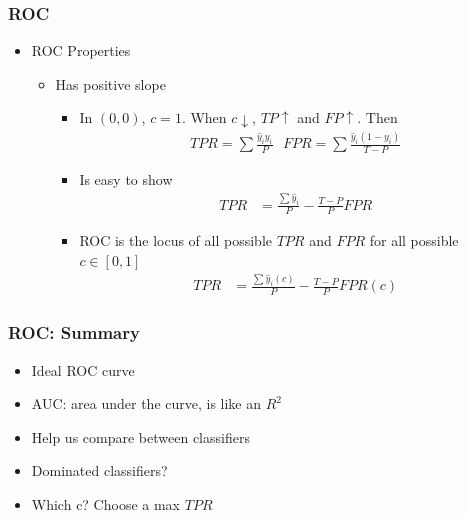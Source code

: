 \documentclass[
  shownotes,
  xcolor={svgnames},
  hyperref={colorlinks,citecolor=DarkBlue,linkcolor=DarkRed,urlcolor=DarkBlue}
  , aspectratio=169]{beamer}
\begin{document}
\begin{frame}[fragile]
\frametitle{ROC}
\begin{itemize}
  \item ROC Properties 

  \begin{itemize}
  \item Has positive slope
  \begin{itemize}
    \item In $(0,0)$, $c=1$. When $c\downarrow$, $TP \uparrow$ and $FP\uparrow$. Then
    \begin{align}
    TPR = \sum \frac{\hat{y}_iy_i}{P} \,\,\,\, FPR = \sum \frac{\hat{y}_i(1-y_i)}{T-P}
    \end{align}
    \item Is easy to show
    \begin{align}
    TPR &= \frac{\sum \hat{y}_i}{P} - \frac{T-P}{P}FPR
    \end{align}
    \item ROC is the locus of all possible $TPR$ and $FPR$ for all possible $c\in[0,1]$ 
    \begin{align}
    TPR &= \frac{\sum \hat{y}_i(c)}{P} - \frac{T-P}{P}FPR(c)
    \end{align}
  \end{itemize}
\end{itemize}  
\end{itemize}




\end{frame}
\begin{frame}[fragile]
\frametitle{ROC: Summary}

\begin{itemize}
  \item Ideal ROC curve
  \medskip
  \item AUC: area under the curve, is like an $R^2$
  \medskip
  \item Help us compare between classifiers
  \medskip
  \item Dominated classifiers?
  \medskip
  \item Which c? Choose a max $TPR$

\end{itemize}

\end{frame}


\end{document}
